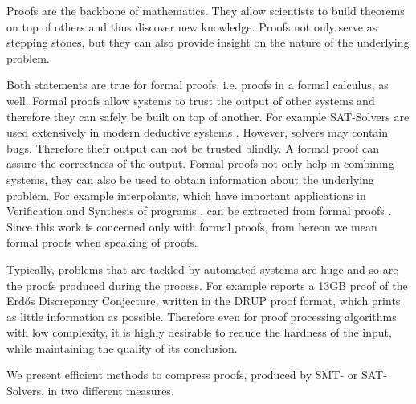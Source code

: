 Proofs are the backbone of mathematics. 
They allow scientists to build theorems on top of others and thus discover new knowledge.
Proofs not only serve as stepping stones, but they can also provide insight on the nature of the underlying problem.

Both statements are true for formal proofs, i.e. proofs in a formal calculus, as well.
Formal proofs allow systems to trust the output of other systems and therefore they can safely be built on top of another. 
For example SAT-Solvers are used extensively in modern deductive systems \cite{Biere2009}. 
However, solvers may contain bugs. 
Therefore their output can not be trusted blindly.
A formal proof can assure the correctness of the output.
Formal proofs not only help in combining systems, they can also be used to obtain information about the underlying problem.
For example interpolants, which have important applications in Verification and Synthesis of programs \cite{McMill2005}, can be extracted from formal proofs \cite{Hofferek2013}.
Since this work is concerned only with formal proofs, from hereon we mean formal proofs when speaking of proofs.

Typically, problems that are tackled by automated systems are huge and so are the proofs produced during the process.
For example \cite{Konev2014} reports a 13GB proof of the Erd\H{o}s Discrepancy Conjecture, written in the DRUP proof format, which prints as little information as possible.
Therefore even for proof processing algorithms with low complexity, it is highly desirable to reduce the hardness of the input, while maintaining the quality of its conclusion.

We present efficient methods to compress proofs, produced by SMT- or SAT- Solvers, in two different measures.

